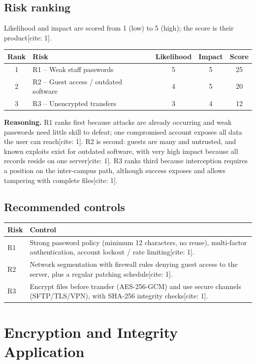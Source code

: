 \documentclass[11pt,a4paper]{article}
\begin{document}
\subsection{Risk ranking}
Likelihood and impact are scored from 1 (low) to 5 (high); the score is their product[cite: 1].
\begin{center}
\begin{tabular}{@{}clccc@{}}
\toprule
Rank & Risk & Likelihood & Impact & Score\\ \midrule
1 & R1 -- Weak staff passwords & 5 & 5 & 25\\
2 & R2 -- Guest access / outdated software & 4 & 5 & 20\\
3 & R3 -- Unencrypted transfers & 3 & 4 & 12\\ \bottomrule
\end{tabular}
\end{center}
\textbf{Reasoning.} R1 ranks first because attacks are already occurring and weak passwords need little skill to
defeat; one compromised account exposes all data the user can reach[cite: 1]. R2 is second: guests are many and untrusted, and
known exploits exist for outdated software, with very high impact because all records reside on one server[cite: 1]. R3 ranks
third because interception requires a position on the inter-campus path, although success exposes and allows tampering with complete files[cite: 1].

\subsection{Recommended controls}
\begin{center}
\begin{tabular}{@{}lp{11cm}@{}}
\toprule
Risk & Control\\ \midrule
R1 & Strong password policy (minimum 12 characters, no reuse), multi-factor authentication, account lockout / rate limiting[cite: 1].\\
R2 & Network segmentation with firewall rules denying guest access to the server, plus a regular patching schedule[cite: 1].\\
R3 & Encrypt files before transfer (AES-256-GCM) and use secure channels (SFTP/TLS/VPN), with SHA-256 integrity checks[cite: 1].\\
\bottomrule
\end{tabular}
\end{center}

\section{Encryption and Integrity Application}
\end{document}
